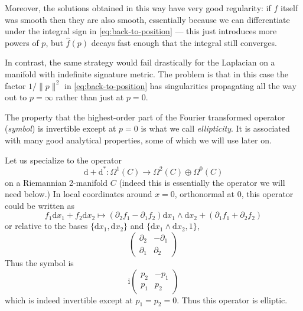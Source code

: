 \documentclass[12pt,letterpaper,reqno]{article}
\numberwithin{equation}{section}
\newcommand{\I}{{\mathrm i}}
\newcommand{\de}{\mathrm{d}}
\newcommand{\norm}[1]{\lVert#1\rVert}
\newcommand{\ti}[1]{\textit{#1}}
\begin{document}
Moreover, the solutions obtained in this
way have very good regularity: if $f$ itself was smooth then they are also
smooth, essentially because we can differentiate under the integral sign in
\eqref{eq:back-to-position} --- this just introduces more powers of
$p$, but $\hat f(p)$ decays fast enough that the integral still
converges.

In contrast, the same strategy would fail drastically for the
Laplacian on a manifold with indefinite signature metric.
The problem is that in this case the factor $1 / \norm{p}^2$
in \eqref{eq:back-to-position} has singularities propagating
all the way out to $p = \infty$ rather than just at $p=0$.

The property that the highest-order part of the
Fourier transformed operator (\ti{symbol}) is invertible except
at $p=0$ is what we call \ti{ellipticity}. It is associated
with many good analytical properties, some of which we will
use later on.

Let us specialize to the operator
\begin{equation}
  \de + \de^*: \Omega^1(C) \to \Omega^2(C) \oplus \Omega^0(C)
\end{equation}
on a Riemannian 2-manifold $C$ (indeed this is essentially the
operator we will need below.)
In local coordinates around $x = 0$, orthonormal at $0$,
this operator could be written as
\begin{equation}
 f_1 \de x_1 + f_2 \de x_2 \mapsto (\partial_2 f_1 - \partial_1 f_2) \de x_1 \wedge \de x_2 + (\partial_1 f_1 + \partial_2 f_2)
\end{equation}
or relative to the bases $\{\de x_1, \de x_2\}$ and $\{\de x_1 \wedge \de x_2, 1\}$,
\begin{equation}
  \begin{pmatrix} \partial_2 & -\partial_1 \\ \partial_1 & \partial_2 \end{pmatrix}
\end{equation}
Thus the symbol is
\begin{equation}
  \I \begin{pmatrix} p_2 & -p_1 \\ p_1 & p_2 \end{pmatrix}
\end{equation}
which is indeed invertible except at $p_1 = p_2 = 0$.
Thus this operator is elliptic.
\end{document}

